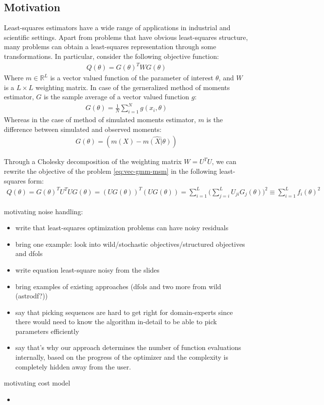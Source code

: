 \subsection{Motivation}
\label{subsec:intro-motiv}


Least-squares estimators have a wide range of applications in industrial and scientific settings. Apart from problems that have obvious least-squares structure, many problems can obtain a least-squares representation through some transformations. In particular, consider the following objective function:
\begin{align}
    Q(\theta) = G(\theta)^TWG(\theta)
    \label{eq:vec-gmm-msm}
\end{align}
Where $m\in\mathbb{R}^L$ is a vector valued function of the parameter of interest $\theta$, and $W$ is a $L\times L$ weighting matrix. In case of the gerneralized method of moments estimator, $G$ is the sample average of a vector valued function $g$:
\begin{align}
    G(\theta) = \frac{1}{N}\sum\limits_{i=1}^Ng(x_i,\theta)
    \label{eq:m-gmm}
\end{align}
Whereas in the case of method of simulated moments estimator, $m$ is the difference between simulated and observed moments:
\begin{align}
    G(\theta) = (m(X)-\hat{m(X|\theta)})
\end{align}

Through a Cholesky decomposition of the weighting matrix $W = U^TU$, we can rewrite the objective of the problem \ref{eq:vec-gmm-msm} in the following least-squares form:
\begin{align}
    Q(\theta)=G(\theta)^TU^TUG(\theta)=(UG(\theta))^T(UG(\theta))=\sum\limits_{i=1}^L\Big(\sum\limits_{j=i}^LU_{ji}G_j(\theta)\Big)^2\equiv\sum\limits_{i=1}^{L}f_i(\theta)^2
\end{align}

motivating noise handling:
\begin{itemize}
    \item write that least-squares optimization problems can have noisy residuals
    \item bring one example: look into wild/stochastic objectives/structured objectives and dfols
    \item write equation least-square noisy from the slides
    \item bring examples of existing approaches (dfols and two more from wild (astrodf?))
    \item say that picking sequences are hard to get right for domain-experts since there would need to know the algorithm in-detail to be able to pick parameters efficiently
    \item say that's why our approach determines the number of function evaluations internally, based on the progress of the optimizer and the complexity is completely hidden away from the user.
\end{itemize}

motivating cost model
\begin{itemize}
    \item
\end{itemize}
